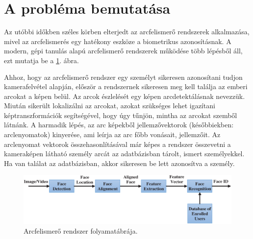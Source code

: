 
\section{A probléma bemutatása}
\label{sec:problem}





Az utóbbi időkben széles körben elterjedt az arcfelismerő rendszerek alkalmazása, mivel az arcfelismerés egy hatékony eszköze a biometrikus azonosításnak. A modern, gépi tanulás alapú arcfelismerő rendszerek működése több lépésből áll, ezt mutatja be a \ref{fig:fr}. ábra. 

Ahhoz, hogy az arcfelismerő rendszer egy személyt sikeresen azonosítani tudjon kamerafelvétel alapján, először a rendszernek sikeresen meg kell találja az emberi arcokat a képen belül. Az arcok észlelését egy képen arcdetektálásnak nevezzük. Miután sikerült lokalizálni az arcokat, azokat szükséges lehet igazítani képtranszformációk segítségével, hogy úgy tűnjön, mintha az arcokat szemből látnánk. A harmadik lépés, az arc képekből jellemzővektorok (későbbiekben: arclenyomatok) kinyerése, ami leírja az arc főbb vonásait, jellemzőit. Az arclenyomat vektorok összehasonlításával már képes a rendszer összevetni a kameraképen látható személy arcát az adatbázisban tárolt, ismert személyekkel. Ha van találat az adatbázisban, akkor sikeresen be lett azonosítva a személy. \cite{hassan2021face}

\begin{figure}[ht]
	\centering
	\includegraphics[width=1\columnwidth]{figures/facerecognition.png}
	\caption{Arcfelismerő rendszer folyamatábrája. \cite{hassan2021face}}
	\label{fig:fr}
\end{figure}

